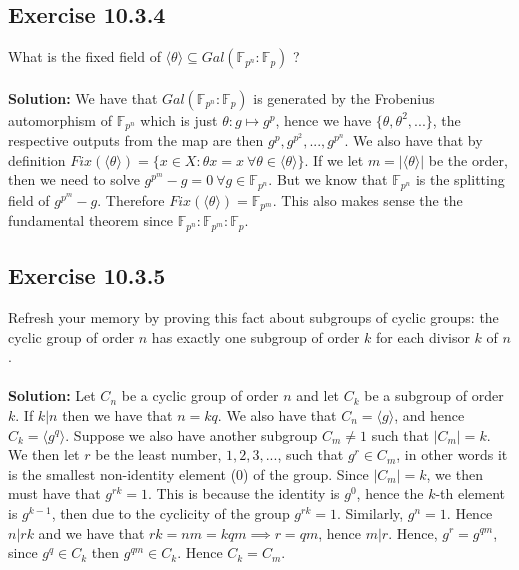 \documentclass{article}
\begin{document}
\subsection*{Exercise 10.3.4}
What is the fixed field of $\langle \theta \rangle \subseteq Gal(\mathbb{F}_{p^n}:\mathbb{F}_p)$ ?
\\\\
\textbf{Solution:}
We have that $Gal(\mathbb{F}_{p^n}:\mathbb{F}_p)$ is generated by the Frobenius automorphism of $\mathbb{F}_{p^n}$ which is just $\theta: g \mapsto g^p$,
hence we have $\{ \theta, \theta^2, ... \}$, the respective outputs from the map are then $g^p, g^{p^2}, ... , g^{p^n}$.
We also have that by definition $Fix(\langle \theta \rangle) = \{ x \in X: \theta x = x \ \forall \theta \in \langle \theta \rangle\}$.
If we let $m = |\langle \theta \rangle|$ be the order, 
then we need to solve $g^{p^m} - g = 0 \ \forall g \in \mathbb{F}_{p^n}$. But we know that $\mathbb{F}_{p^n}$ is the splitting field of $g^{p^m} - g$.
Therefore $Fix(\langle \theta \rangle) = \mathbb{F}_{p^m}$.
This also makes sense the the fundamental theorem since $\mathbb{F}_{p^n}:\mathbb{F}_{p^m}:\mathbb{F}_{p}$.

\subsection*{Exercise 10.3.5}
Refresh your memory by proving this fact about
subgroups of cyclic groups: the cyclic group of 
order $n$ has exactly one subgroup
of order $k$ for each divisor $k$ of $n$.
\\\\
\textbf{Solution:}
Let $C_n$ be a cyclic group of order $n$ and let $C_k$ be a subgroup of order $k$.
If $k|n$ then we have that $n = kq$.
We also have that $C_n = \langle g \rangle$, and hence $C_k = \langle g^q \rangle$.
Suppose we also have another subgroup $C_m \neq 1$ such that $|C_m| = k$.
We then let $r$ be the least number, $1,2,3,...$, such that $g^r \in C_m$, in other words it is the
smallest non-identity element (0) of the group. 
Since $|C_m| = k$, we then must have that $g^{rk} = 1$.
This is because the identity is $g^0$, hence the $k$-th element is $g^{k-1}$, then
due to the cyclicity of the group $g^{rk} = 1$. Similarly, $g^n = 1$. Hence $n|rk$ and we have that $rk = nm = kqm \implies r=qm$,
hence $m|r$. Hence, $g^r = g^{qm}$, since $g^q \in C_k$ then $g^{qm} \in C_k$.
Hence $C_k = C_m$.
\\\\
\end{document}
